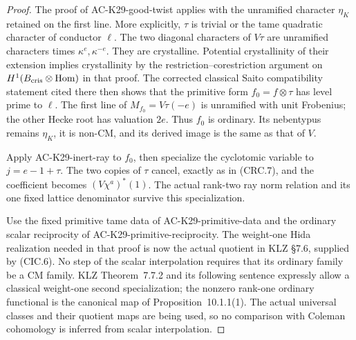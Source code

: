 \begin{proof}
The proof of AC-K29-good-twist applies with the
unramified character $\eta_K$ retained on the first
line.  More explicitly, $\tau$ is trivial or the tame
quadratic character of conductor $\ell$.  The two
diagonal characters of $V\tau$ are unramified
characters times $\kappa^e,\kappa^{-e}$.
They are crystalline.  Potential crystallinity of
their extension implies crystallinity by the
restriction--corestriction argument on
$H^1(B_{\rm cris}\otimes\operatorname{Hom})$ in that
proof.  The corrected classical Saito compatibility
statement cited there then shows that the primitive
form $f_0=f\otimes\tau$ has level prime to $\ell$.
The first line of $M_{f_0}=V\tau(-e)$ is unramified
with unit Frobenius; the other Hecke root has valuation
$2e$.  Thus $f_0$ is ordinary.  Its nebentypus remains
$\eta_K$, it is non-CM, and its derived image is the
same as that of $V$.

Apply AC-K29-inert-ray to $f_0$, then specialize the
cyclotomic variable to $j=e-1+\tau$.  The two copies
of $\tau$ cancel, exactly as in (CRC.7), and the
coefficient becomes $(V\chi^a)^*(1)$.  The actual
rank-two ray norm relation and its one fixed lattice
denominator survive this specialization.

Use the fixed primitive tame data of
AC-K29-primitive-data and the ordinary scalar
reciprocity of AC-K29-primitive-reciprocity.  The
weight-one Hida realization needed in that proof is
now the actual quotient in KLZ \S7.6, supplied by
(CIC.6).  No step of the scalar interpolation requires
that its ordinary family be a CM family.  KLZ
Theorem~7.7.2 and its following sentence expressly
allow a classical weight-one second specialization;
the nonzero rank-one ordinary functional is the
canonical map of Proposition~10.1.1(1).  The actual
universal classes and their quotient maps are being
used, so no comparison with Coleman cohomology is
inferred from scalar interpolation.


\end{proof}
